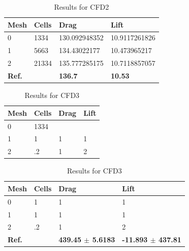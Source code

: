 \begin{table}[!ht]
\begin{center}
  \begin{tabular}{|l | l | l | l|} \hline
	Mesh & Cells & Drag & Lift \\ \hline
    0  & 1334 & 130.092948352 & 10.9117261826 \\   \hline
    1 & 5663 & 134.43022177 & 10.473965217 \\ \hline
    2 & 21334 & 135.777285175 & 10.7118857057 \\ \hline \hline
    \textbf{Ref.}  & & \textbf{136.7} & \textbf{10.53} \\ \hline 
    \hline
  \end{tabular}
\end{center}
\caption{Results for CFD2}
\end{table}
\begin{table}[!ht]
\begin{center}
  \begin{tabular}{|l | l | l | l|} \hline
	Mesh & Cells & Drag & Lift \\ \hline
    0  & 1334 &  & \\   \hline
    1 & 1 & 1 & 1 \\ \hline
    2 &.2 & 1 & 2   \\ \hline \hline
    \hline
  \end{tabular}
  \begin{tabular}{|l | l | l | l|} \hline
	Mesh & Cells & Drag & Lift \\ \hline
    0  & 1 & 1 & 1 \\   \hline
    1 & 1 & 1 & 1 \\ \hline
    2 &.2 & 1 & 2   \\ \hline \hline
    \textbf{Ref.}  & & \textbf{439.45 $\pm$ 5.6183} & \textbf{-11.893 $\pm$ 437.81} \\ \hline 
    \hline
  \end{tabular}
\end{center}
\caption{Results for CFD3}
\end{table}
